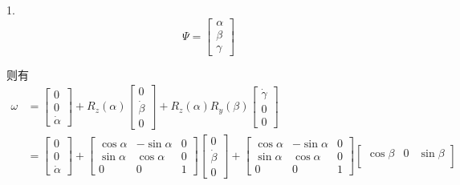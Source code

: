 \documentclass[UTF8, 12pt]{ctexart}
\begin{document}
1.
\[
\Psi = \begin{bmatrix}
        \alpha \\
        \beta \\
        \gamma
        \end{bmatrix}
\]

则有
\[
\begin{aligned}
    \omega &= \begin{bmatrix}
                0 \\
                0 \\
                \dot{\alpha}
            \end{bmatrix}
            + R_z(\alpha)
            \begin{bmatrix}
                0 \\
                \dot{\beta} \\
                0
            \end{bmatrix}
            + R_z(\alpha)R_y(\beta)
            \begin{bmatrix}
                \dot{\gamma} \\
                0 \\
                0
            \end{bmatrix} \\
    &= \begin{bmatrix}
        0 \\
        0 \\
        \dot{\alpha}
        \end{bmatrix}
        + \begin{bmatrix}
            \cos\alpha & -\sin\alpha & 0 \\
            \sin\alpha & \cos\alpha & 0 \\
            0 & 0 & 1
        \end{bmatrix}
        \begin{bmatrix}
            0 \\
            \dot{\beta} \\
            0
        \end{bmatrix}
        + \begin{bmatrix}
            \cos\alpha & -\sin\alpha & 0 \\
            \sin\alpha & \cos\alpha & 0 \\
            0 & 0 & 1
        \end{bmatrix}
        \begin{bmatrix}
            \cos\beta & 0 & \sin\beta \\

\end{bmatrix}
\end{aligned}\]
\end{document}
